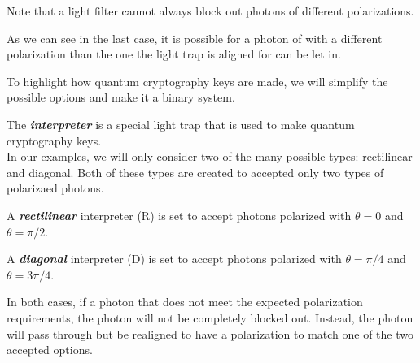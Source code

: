 \item Note that a light filter cannot always block out photons of different polarizations.

\item As we can see in the last case, it is possible for a photon of with a different polarization than the one the light trap is aligned for can be let in.

\item To highlight how quantum cryptography keys are made, we will simplify the possible options and make it a binary system.

\item The \textit{\textbf{interpreter}} is a special light trap that is used to make quantum cryptography keys.
\\In our examples, we will only consider two of the many possible types: rectilinear and diagonal. Both of these types are created to accepted only two types of polarizaed photons.
\item A \textit{\textbf{rectilinear}} interpreter (R) is set to accept photons polarized with $\theta = 0$ and $\theta = \pi / 2$.
\item A \textit{\textbf{diagonal}} interpreter (D) is set to accept photons polarized with $\theta = \pi / 4$ and $\theta = 3\pi / 4$.
\item In both cases, if a photon that does not meet the expected polarization requirements, the photon will not be completely blocked out. Instead, the photon will pass through but be realigned to have a polarization to match one of the two accepted options.

